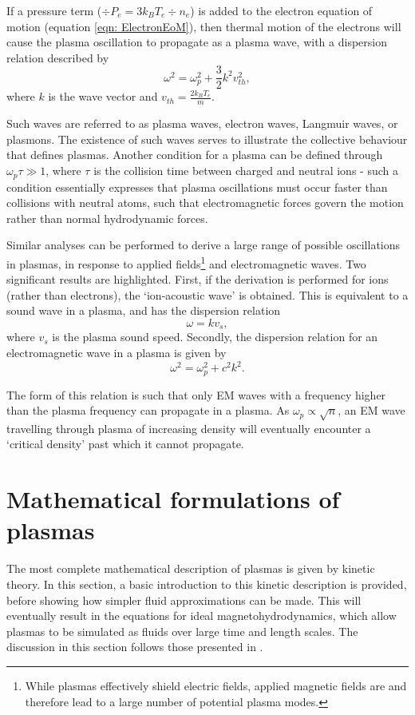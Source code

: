 If a pressure term ($\div P_e = 3 k_B T_e \div n_e$) is added to the electron equation of motion (equation \ref{eqn: ElectronEoM}), then thermal motion of the electrons will cause the plasma oscillation to propagate as a plasma wave, with a dispersion relation described by
\begin{equation} \omega^2 = \omega_p^2 + \frac{3}{2} k^2 v_{th}^2, \end{equation}
where $k$ is the wave vector and $v_{th} = \frac{2 k_B T_e}{m}$. 

Such waves are referred to as plasma waves, electron waves, Langmuir waves, or plasmons. The existence of such waves serves to illustrate the collective behaviour that defines plasmas. Another condition for a plasma can be defined through $\omega_p \tau \gg 1$, where $\tau$ is the collision time between charged and neutral ions - such a condition essentially expresses that plasma oscillations must occur faster than collisions with neutral atoms, such that electromagnetic forces govern the motion rather than normal hydrodynamic forces.

Similar analyses can be performed to derive a large range of possible oscillations in plasmas, in response to applied fields\footnote{While plasmas effectively shield electric fields, applied magnetic fields are and therefore lead to a large number of potential plasma modes.} and electromagnetic waves. Two  significant results are highlighted. First, if the derivation is performed for ions (rather than electrons), the `ion-acoustic wave' is obtained. This is equivalent to a sound wave in a plasma, and has the dispersion relation
\begin{equation} \omega = k v_s, \end{equation} where $v_s$ is the plasma sound speed. Secondly, the dispersion relation for an electromagnetic wave in a plasma is given by 
\begin{equation} \omega^2 = \omega_p^2 + c^2k^2. \end{equation}

The form of this relation is such that only EM waves with a frequency higher than the plasma frequency can propagate in a plasma. As  $\omega_p \propto \sqrt{n}$, an EM wave travelling through plasma of increasing density will eventually encounter a `critical density' past which it cannot propagate. 

\section{Mathematical formulations of plasmas}
The most complete mathematical description of plasmas is given by kinetic theory. In this section, a basic introduction to this kinetic description is provided, before showing how simpler fluid approximations can be made. This will eventually result in the equations for ideal magnetohydrodynamics, which allow plasmas to be simulated as fluids over large time and length scales. The discussion in this section follows those presented in \cite{Chen2015, Piel2017, Belmont2019}.

